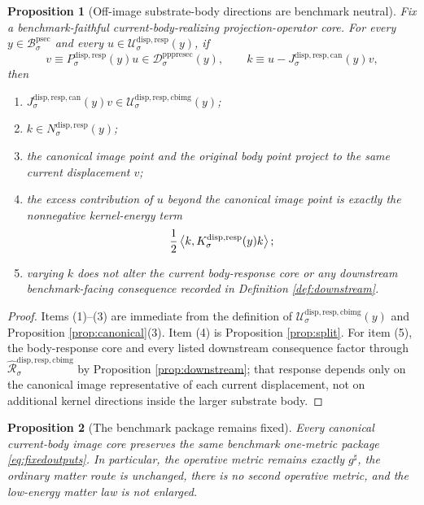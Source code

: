 \documentclass[11pt]{article}
\newcommand{\CompletedMetric}{g^{\sharp}}
\newcommand{\ProtoSectionBody}[1]{\mathcal B_{#1}^{\mathrm{psec}}}
\newcommand{\PrePreProtoSectionResidualBody}[1]{\mathcal D_{#1}^{\mathrm{pppresec}}}
\newcommand{\SubstrateBody}[1]{\mathcal U_{#1}^{\mathrm{disp,resp}}}
\newcommand{\SubstrateProjection}[1]{P_{#1}^{\mathrm{disp,resp}}}
\newcommand{\SubstrateOperator}[1]{K_{#1}^{\mathrm{disp,resp}}}
\newcommand{\SubstrateKernel}[1]{N_{#1}^{\mathrm{disp,resp}}}
\newcommand{\CanonicalLift}[1]{J_{#1}^{\mathrm{disp,resp,can}}}
\newcommand{\CanonicalImageBody}[1]{\mathcal U_{#1}^{\mathrm{disp,resp,cbimg}}}
\newcommand{\CanonicalImageResponse}[1]{\widehat{\mathscr R}_{#1}^{\mathrm{disp,resp,cbimg}}}
\newtheorem{proposition}{Proposition}
\begin{document}
\begin{proposition}[Off-image substrate-body directions are benchmark neutral]
\label{prop:neutral}
Fix a benchmark-faithful current-body-realizing projection-operator core. For every \(y\in\ProtoSectionBody{\sigma}\) and every \(u\in\SubstrateBody{\sigma}(y)\), if
\[
v\equiv\SubstrateProjection{\sigma}(y)u
\in
\PrePreProtoSectionResidualBody{\sigma}(y),
\qquad
k\equiv u-\CanonicalLift{\sigma}(y)v,
\]
then
\begin{enumerate}
    \item \(\CanonicalLift{\sigma}(y)v\in\CanonicalImageBody{\sigma}(y)\);
    \item \(k\in\SubstrateKernel{\sigma}(y)\);
    \item the canonical image point and the original body point project to the same current displacement \(v\);
    \item the excess contribution of \(u\) beyond the canonical image point is exactly the nonnegative kernel-energy term
    \[
    \frac{1}{2}\ev{k,\SubstrateOperator{\sigma}(y)k};
    \]
    \item varying \(k\) does not alter the current body-response core or any downstream benchmark-facing consequence recorded in Definition \ref{def:downstream}.
\end{enumerate}
\end{proposition}

\begin{proof}
Items (1)--(3) are immediate from the definition of \(\CanonicalImageBody{\sigma}(y)\) and Proposition \ref{prop:canonical}(3). Item (4) is Proposition \ref{prop:split}. For item (5), the body-response core and every listed downstream consequence factor through \(\CanonicalImageResponse{\sigma}\) by Proposition \ref{prop:downstream}; that response depends only on the canonical image representative of each current displacement, not on additional kernel directions inside the larger substrate body.
\end{proof}

\begin{proposition}[The benchmark package remains fixed]
\label{prop:benchmark}
Every canonical current-body image core preserves the same benchmark one-metric package \eqref{eq:fixedoutputs}. In particular, the operative metric remains exactly \(\CompletedMetric\), the ordinary matter route is unchanged, there is no second operative metric, and the low-energy matter law is not enlarged.
\end{proposition}
\end{document}
